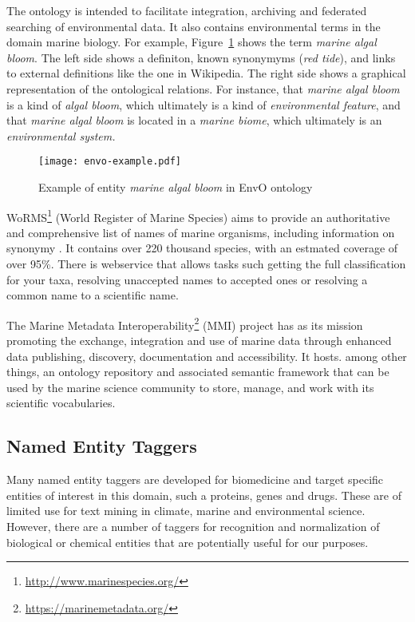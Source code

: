 \documentclass[11pt,oneside,a4paper]{report}
\begin{document}
\noindent The ontology is intended to facilitate integration, archiving and federated searching of environmental data.
It also contains environmental terms in the domain marine biology.
For example, Figure~\ref{fig:envo-example} shows the term \emph{marine algal bloom}.
The left side shows a definiton, known synonymyms (\emph{red tide}), and links to external definitions like the one in Wikipedia.
The right side shows a graphical representation of the ontological relations.
For instance, that \emph{marine algal bloom} is a kind of \emph{algal bloom}, which ultimately is a kind of \emph{environmental feature}, and that  \emph{marine algal bloom} is located in a\emph{ marine biome}, which ultimately is an \emph{environmental system.}

\begin{figure}
\begin{center}
\texttt{[image: envo-example.pdf]}
 \caption{Example of entity \emph{marine algal bloom} in EnvO ontology}
\label{fig:envo-example}
\end{center}
\end{figure}


WoRMS\footnote{\url{http://www.marinespecies.org/}}  (World Register of Marine Species) aims to provide an authoritative and comprehensive list of names of marine organisms, including information on synonymy \citep{Costello2013Global}.
It contains over 220 thousand species, with an estmated coverage of over 95\%.
There is webservice that allows tasks such getting the full classification for your taxa, resolving unaccepted names to accepted ones or resolving a common name to a scientific name.

The Marine Metadata Interoperability\footnote{\url{https://marinemetadata.org/}} (MMI) project has as its mission promoting the exchange, integration and use of marine data through enhanced data publishing, discovery, documentation and accessibility.
It hosts. among other things, an ontology repository and associated semantic framework that can be used by the marine science community to store, manage, and work with its scientific vocabularies.


\subsection{Named Entity Taggers}

Many named entity taggers are developed for biomedicine and target specific entities of interest in this domain, such a proteins, genes and drugs.
These are of limited use for text mining in climate, marine and environmental science. 
However, there are a number of taggers for recognition and normalization of biological or chemical entities that are potentially useful for our purposes.
\end{document}
